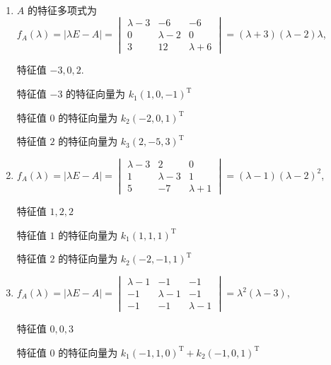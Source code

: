 	 \paragraph{} %
		 \begin{enumerate}
			 \item %
			       \( A \) 的特征多项式为 \( f_{A}(\lambda) = |\lambda E - A| = \begin{vmatrix}
				       \lambda - 3 & -6          & -6          \\
				       0           & \lambda - 2 & 0           \\
				       3           & 12          & \lambda + 6
			       \end{vmatrix} = (\lambda + 3)(\lambda - 2)\lambda \),

			       特征值 \( -3, 0, 2 \).

			       特征值 \( -3 \) 的特征向量为 \( k_1(1, 0, -1)^{\mathrm{T}} \)

			       特征值 \( 0 \) 的特征向量为 \( k_2(-2, 0, 1)^{\mathrm{T}} \)

			       特征值 \( 2 \) 的特征向量为 \( k_3(2, -5, 3)^{\mathrm{T}} \)
			 \item %
			       \( f_{A}(\lambda) = |\lambda E - A| = \begin{vmatrix}
				       \lambda - 3 & 2           & 0           \\
				       1           & \lambda - 3 & 1           \\
				       5           & -7          & \lambda + 1
			       \end{vmatrix} = (\lambda - 1)(\lambda - 2)^{2} \),

			       特征值 \( 1, 2, 2 \)

			       特征值 \( 1 \) 的特征向量为 \( k_1(1, 1, 1)^{\mathrm{T}} \)

			       特征值 \( 2 \) 的特征向量为 \( k_2(-2, -1, 1)^{\mathrm{T}} \)
			 \item %
			       \( f_{A}(\lambda) = |\lambda E - A| = \begin{vmatrix}
				       \lambda - 1 & -1          & -1          \\
				       -1          & \lambda - 1 & -1          \\
				       -1          & -1          & \lambda - 1
			       \end{vmatrix} = \lambda^{2}(\lambda - 3) \),

			       特征值 \( 0, 0, 3 \)

			       特征值 \( 0 \) 的特征向量为 \( k_1(-1, 1, 0)^{\mathrm{T}} + k_2(-1, 0, 1)^{\mathrm{T}} \)


\end{enumerate}
